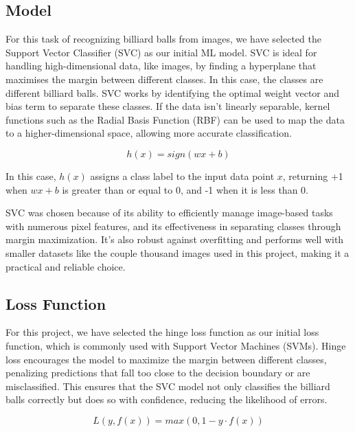 \documentclass{article}
\begin{document}
\subsection{Model}
\label{sec:model}
For this task of recognizing billiard balls from images, we have selected the Support Vector Classifier (SVC) as our initial ML model. 
SVC is ideal for handling high-dimensional data, like images, by finding a hyperplane that maximises the margin between different classes. In this case, 
the classes are different billiard balls. SVC works by identifying the optimal weight vector and bias term to separate these classes. If the data isn't 
linearly separable, kernel functions such as the Radial Basis Function (RBF) can be used to map the data to a higher-dimensional space, allowing more 
accurate classification. \cite{unknownMachineLearningApproach2023, nobleWhatSupportVector2006}

\begin{equation}
    h(x)=sign(wx+b)
\end{equation}

In this case, $h(x)$ assigns a class label  to the input data point $x$, returning +1 when $wx+b$ is greater than or equal to 0, and -1 
when it is less than 0.

SVC was chosen because of its ability to efficiently manage image-based tasks with numerous pixel features, and its effectiveness in separating 
classes through margin maximization. It's also robust against overfitting and performs well with smaller datasets like the couple thousand images 
used in this project, making it a practical and reliable choice. \cite{unknownMachineLearningApproach2023, nobleWhatSupportVector2006}

\subsection{Loss Function}
\label{sec:loss_function}
For this project, we have selected the hinge loss function as our initial loss function, which is commonly used with Support Vector Machines (SVMs). 
Hinge loss encourages the model to maximize the margin between different classes, penalizing predictions that fall too close to the decision boundary 
or are misclassified. This ensures that the SVC model not only classifies the billiard balls correctly but does so with confidence, 
reducing the likelihood of errors. \cite{unknownMachineLearningApproach2023, bartlettClassificationRejectOption2008}

\begin{equation}
    L(y, f(x)) = max(0, 1-y \cdot f(x))
\end{equation}
\end{document}
